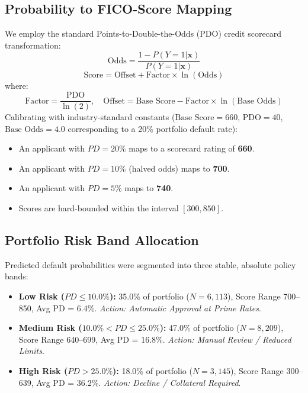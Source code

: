 \documentclass[conference]{IEEEtran}
\begin{document}
\subsection{Probability to FICO-Score Mapping}
We employ the standard Points-to-Double-the-Odds (PDO) credit scorecard transformation:
\begin{equation}
\text{Odds} = \frac{1 - P(Y=1|\mathbf{x})}{P(Y=1|\mathbf{x})}
\end{equation}
\begin{equation}
\text{Score} = \text{Offset} + \text{Factor} \times \ln(\text{Odds})
\end{equation}
where:
\begin{equation}
\text{Factor} = \frac{\text{PDO}}{\ln(2)}, \quad \text{Offset} = \text{Base Score} - \text{Factor} \times \ln(\text{Base Odds})
\end{equation}
Calibrating with industry-standard constants ($\text{Base Score} = 660$, $\text{PDO} = 40$, $\text{Base Odds} = 4.0$ corresponding to a 20\% portfolio default rate):
\begin{itemize}
    \item An applicant with $PD = 20\%$ maps to a scorecard rating of \textbf{660}.
    \item An applicant with $PD = 10\%$ (halved odds) maps to \textbf{700}.
    \item An applicant with $PD = 5\%$ maps to \textbf{740}.
    \item Scores are hard-bounded within the interval $[300, 850]$.
\end{itemize}

\subsection{Portfolio Risk Band Allocation}
Predicted default probabilities were segmented into three stable, absolute policy bands:
\begin{itemize}
    \item \textbf{Low Risk ($PD \le 10.0\%$):} 35.0\% of portfolio ($N = 6,113$), Score Range 700--850, Avg PD = 6.4\%. \textit{Action: Automatic Approval at Prime Rates}.
    \item \textbf{Medium Risk ($10.0\% < PD \le 25.0\%$):} 47.0\% of portfolio ($N = 8,209$), Score Range 640--699, Avg PD = 16.8\%. \textit{Action: Manual Review / Reduced Limits}.
    \item \textbf{High Risk ($PD > 25.0\%$):} 18.0\% of portfolio ($N = 3,145$), Score Range 300--639, Avg PD = 36.2\%. \textit{Action: Decline / Collateral Required}.
\end{itemize}
\end{document}
